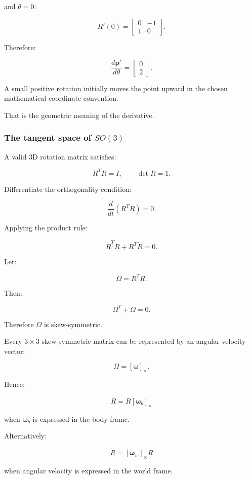 and \(\theta=0\):

\[
R'(0)= \begin{bmatrix} 0&-1\\ 1&0 \end{bmatrix}.
\]

Therefore:

\[
\frac{d\mathbf p'}{d\theta} = \begin{bmatrix} 0\\2 \end{bmatrix}.
\]

A small positive rotation initially moves the point upward in the chosen mathematical coordinate convention.

That is the geometric meaning of the derivative.

\subsubsection{\texorpdfstring{The tangent space of \(SO(3)\)}{The tangent space of SO(3)}}\label{02-foundations-ii-ch027-the-tangent-space-of-so3}

A valid 3D rotation matrix satisfies:

\[
R^TR=I, \qquad \det R=1.
\]

Differentiate the orthogonality condition:

\[
\frac d{dt}(R^TR)=0.
\]

Applying the product rule:

\[
\dot R^TR+R^T\dot R=0.
\]

Let:

\[
\Omega=R^T\dot R.
\]

Then:

\[
\Omega^T+\Omega=0.
\]

Therefore \(\Omega\) is skew-symmetric.

Every \(3\times3\) skew-symmetric matrix can be represented by an angular velocity vector:

\[
\Omega=[\boldsymbol\omega]_\times.
\]

Hence:

\[
\boxed{ \dot R=R[\boldsymbol\omega_b]_\times }
\]

when \(\boldsymbol\omega_b\) is expressed in the body frame.

Alternatively:

\[
\boxed{ \dot R=[\boldsymbol\omega_w]_\times R }
\]

when angular velocity is expressed in the world frame.

